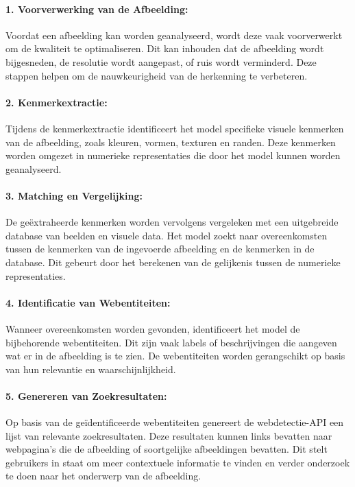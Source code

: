 \paragraph{1. Voorverwerking van de Afbeelding:}
Voordat een afbeelding kan worden geanalyseerd, wordt deze vaak voorverwerkt om de kwaliteit te optimaliseren. Dit kan inhouden dat de afbeelding wordt bijgesneden, de resolutie wordt aangepast, of ruis wordt verminderd. Deze stappen helpen om de nauwkeurigheid van de herkenning te verbeteren.

\paragraph{2. Kenmerkextractie:}
Tijdens de kenmerkextractie identificeert het model specifieke visuele kenmerken van de afbeelding, zoals kleuren, vormen, texturen en randen. Deze kenmerken worden omgezet in numerieke representaties die door het model kunnen worden geanalyseerd.

\paragraph{3. Matching en Vergelijking:}
De geëxtraheerde kenmerken worden vervolgens vergeleken met een uitgebreide database van beelden en visuele data. Het model zoekt naar overeenkomsten tussen de kenmerken van de ingevoerde afbeelding en de kenmerken in de database. Dit gebeurt door het berekenen van de gelijkenis tussen de numerieke representaties.

\paragraph{4. Identificatie van Webentiteiten:}
Wanneer overeenkomsten worden gevonden, identificeert het model de bijbehorende webentiteiten. Dit zijn vaak labels of beschrijvingen die aangeven wat er in de afbeelding is te zien. De webentiteiten worden gerangschikt op basis van hun relevantie en waarschijnlijkheid.

\paragraph{5. Genereren van Zoekresultaten:}
Op basis van de geïdentificeerde webentiteiten genereert de webdetectie-API een lijst van relevante zoekresultaten. Deze resultaten kunnen links bevatten naar webpagina's die de afbeelding of soortgelijke afbeeldingen bevatten. Dit stelt gebruikers in staat om meer contextuele informatie te vinden en verder onderzoek te doen naar het onderwerp van de afbeelding.

